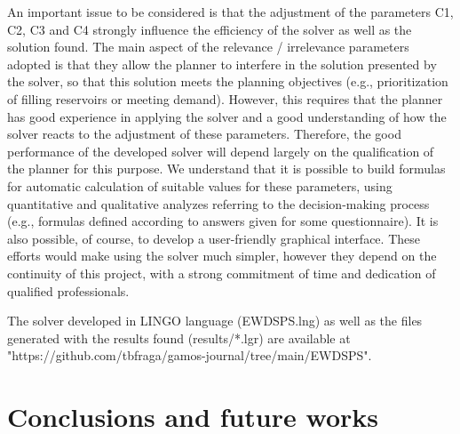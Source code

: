 \documentclass{singlecol}
\theoremstyle{TH}{
\newtheorem{lemma}{Lemma}
\newtheorem{theorem}[lemma]{Theorem}
\newtheorem{corrolary}[lemma]{Corrolary}
\newtheorem{conjecture}[lemma]{Conjecture}
\newtheorem{proposition}[lemma]{Proposition}
\newtheorem{claim}[lemma]{Claim}
\newtheorem{stheorem}[lemma]{Wrong Theorem}
\newtheorem{algorithm}{Algorithm}
}
\theoremstyle{THrm}{
\newtheorem{definition}{Definition}[section]
\newtheorem{question}{Question}[section]
\newtheorem{remark}{Remark}
\newtheorem{scheme}{Scheme}
}
\theoremstyle{THhit}{
\newtheorem{case}{Case}[section]
}
\begin{document}
An important issue to be considered is that the adjustment of the parameters C1, C2, C3 and C4 strongly influence the efficiency of the solver as well as the solution found. The main aspect of the relevance / irrelevance parameters adopted is that they allow the planner to interfere in the solution presented by the solver, so that this solution meets the planning objectives (e.g., prioritization of filling reservoirs or meeting demand). However, this requires that the planner has good experience in applying the solver and a good understanding of how the solver reacts to the adjustment of these parameters. Therefore, the good performance of the developed solver will depend largely on the qualification of the planner for this purpose. We understand that it is possible to build formulas for automatic calculation of suitable values for these parameters, using quantitative and qualitative analyzes referring to the decision-making process (e.g., formulas defined according to answers given for some questionnaire). It is also possible, of course, to develop a user-friendly graphical interface. These efforts would make using the solver much simpler, however they depend on the continuity of this project, with a strong commitment of time and dedication of qualified professionals.

The solver developed in LINGO language (EWDSPS.lng) as well as the files generated with the results found (results/*.lgr) are available at "https://github.com/tbfraga/gamos-journal/tree/main/EWDSPS".

\section{Conclusions and future works}
\label{sec:conclusions}
\end{document}
